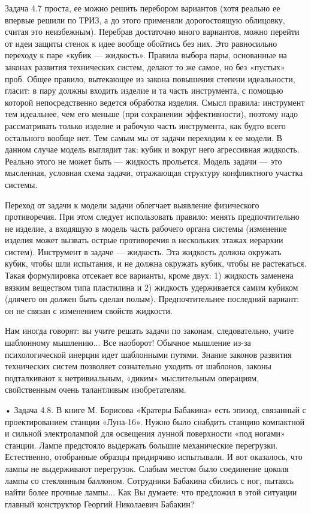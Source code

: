 Задача 4.7 проста,  ее можно решить перебором  вариантов (хотя реально
ее  впервые  решили  по  ТРИЗ,  а  до  этого  применяли  дорогостоящую
облицовку,   считая  это   неизбежным).   Перебрав  достаточно   много
вариантов, можно перейти от идеи  защиты стенок к идее вообще обойтись
без них. Это  равносильно переходу к паре «кубик  — жидкость». Правила
выбора пары, основанные на законах развития технических систем, делают
то же самое, но без «пустых» проб. Общее правило, вытекающее из закона
повышения степени идеальности, гласит: в пару должны входить изделие и
та  часть  инструмента,  с  помощью  которой  непосредственно  ведется
обработка изделия.  Смысл правила:  инструмент тем идеальнее,  чем его
меньше  (при  сохранении  эффективности), поэтому  надо  рассматривать
только изделие и рабочую часть инструмента, как будто всего остального
вообще нет.  Тем самым мы  от задачи переходим  к ее модели.  В данном
случае модель выглядит так: кубик  и вокруг него агрессивная жидкость.
Реально этого не может быть —  жидкость прольется. Модель задачи — это
мысленная,  условная схема  задачи, отражающая  структуру конфликтного
участка системы.

Переход  от задачи  к  модели задачи  облегчает выявление  физического
противоречия.   При   этом   следует  использовать   правило:   менять
предпочтительно  не  изделие,  а  входящую  в  модель  часть  рабочего
органа системы (изменение изделия  может вызвать острые противоречия в
нескольких этажах  иерархии систем).  Инструмент в задаче  — жидкость.
Эта жидкость должна  окружать кубик, чтобы шли испытания,  и не должна
окружать кубик, чтобы не  растекаться. Такая формулировка отсекает все
варианты,  кроме  двух: 1)  жидкость  заменена  вязким веществом  типа
пластилина и 2) жидкость удерживается самим кубиком (длячего он должен
быть сделан полым). Предпочтительнее последний вариант: он не связан с
изменением свойств жидкости.


Нам иногда говорят: вы учите  решать задачи по законам, следовательно,
учите  шаблонному мышлению...  Все  наоборот!  Обычное мышление  из-за
психологической  инерции   идет  шаблонными  путями.   Знание  законов
развития технических систем позволяет сознательно уходить от шаблонов,
законы подталкивают  к нетривиальным, «диким»  мыслительным операциям,
свойственным очень талантливым изобретателям.

•  Задача 4.8.  В книге  М. Борисова  «Кратеры Бабакина»  есть эпизод,
связанный  с проектированием  станции «Луна-16».  Нужно было  снабдить
станцию  компактной  и  сильной  электролампой  для  освещения  лунной
поверхности «под  ногами» станции. Лампе предстояло  выдержать большие
механические  перегрузки. Естественно,  отобранные образцы  придирчиво
испытывали.  И вот  оказалось,  что лампы  не выдерживают  перегрузок.
Слабым  местом было  соединение цоколя  лампы со  стеклянным баллоном.
Сотрудники  Бабакина  сбились  с  ног,  пытаясь  найти  более  прочные
лампы...  Как  Вы  думаете:  что предложил  в  этой  ситуации  главный
конструктор Георгий Николаевич Бабакин?

